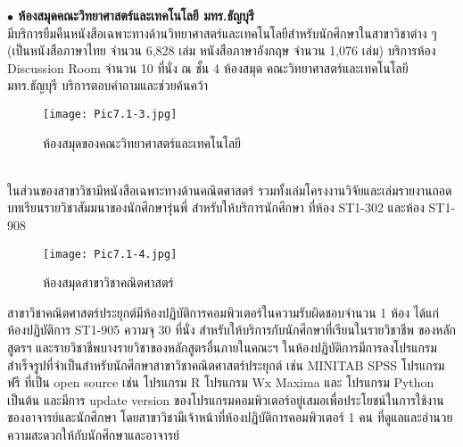 \begin{enumerate}[label={},leftmargin=0cm]
\newpage
{\bf $\bullet$ ห้องสมุดคณะวิทยาศาสตร์และเทคโนโลยี มทร.ธัญบุรี}\\
\hspace*{1cm} มีบริการยืมคืนหนังสือเฉพาะทางด้านวิทยาศาสตร์และเทคโนโลยีสำหรับนักศึกษาในสาขาวิชาต่าง ๆ (เป็นหนังสือภาษาไทย จำนวน 6,828 เล่ม หนังสือภาษาอังกฤษ จำนวน 1,076 เล่ม) บริการห้อง Discussion Room จำนวน 10 ที่นั่ง ณ ชั้น 4 ห้องสมุด คณะวิทยาศาสตร์และเทคโนโลยี มทร.ธัญบุรี บริการตอบคำถามและช่วยค้นคว้า
\begin{figure}[h!]
	\begin{center}
		\texttt{[image: Pic7.1-3.jpg]}\\
		\caption{ห้องสมุดของคณะวิทยาศาสตร์และเทคโนโลยี}
	\end{center}
    \end{figure}
\\
ในส่วนของสาขาวิชามีหนังสือเฉพาะทางด้านคณิตศาสตร์  รวมทั้งเล่มโครงงานวิจัยและเล่มรายงานถอดบทเรียนรายวิชาสัมมนาของนักศึกษารุ่นพี่ สำหรับให้บริการนักศึกษา ที่ห้อง ST1-302 และห้อง ST1-908 
\begin{figure}[h!]
	\begin{center}
		\texttt{[image: Pic7.1-4.jpg]}\\
		\caption{ห้องสมุดสาขาวิชาคณิตศาสตร์}
	\end{center}
\end{figure}

\end{enumerate}
\begin{doclist}
\end{doclist}

สาขาวิชาคณิตศาสตร์ประยุกต์มีห้องปฏิบัติการคอมพิวเตอร์ในความรับผิดชอบจำนวน 1 ห้อง ได้แก่ ห้องปฏิบัติการ ST1-905 ความจุ 30 ที่นั่ง สำหรับให้บริการกับนักศึกษาที่เรียนในรายวิชาชีพ ของหลักสูตรฯ และรายวิชาชีพบางรายวิชาของหลักสูตรอื่นภายในคณะฯ ในห้องปฏิบัติการมีการลงโปรแกรมสำเร็จรูปที่จำเป็นสำหรับนักศึกษาสาขาวิชาคณิตศาสตร์ประยุกต์ เช่น MINITAB  SPSS โปรแกรมฟรี ที่เป็น open source เช่น โปรแกรม R  โปรแกรม Wx Maxima และ โปรแกรม Python เป็นต้น และมีการ update version ของโปรแกรมคอมพิวเตอร์อยู่เสมอเพื่อประโยชน์ในการใช้งานของอาจารย์และนักศึกษา โดยสาขาวิชามีเจ้าหน้าที่ห้องปฏิบัติการคอมพิวเตอร์ 1 คน ที่ดูแลและอำนวยความสะดวกให้กับนักศึกษาและอาจารย์ 

